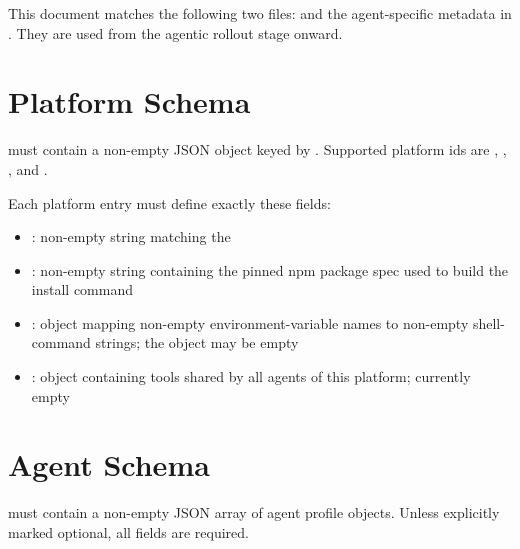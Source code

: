\documentclass[11pt]{article}
\begin{document}
\label{docstart:agent_profiles}
This document matches the following two files:  and the agent-specific metadata in .
They are used from the agentic rollout stage onward.

\section*{Platform Schema}
 must contain a non-empty JSON object keyed by .
Supported platform ids are , , , and .

Each platform entry must define exactly these fields:
\begin{itemize}
\item {}: non-empty string matching the 
\item {}: non-empty string containing the pinned npm package spec used to build the install command
\item {}: object mapping non-empty environment-variable names to non-empty shell-command strings; the object may be empty
\item {}: object containing tools shared by all agents of this platform; currently empty
\end{itemize}

\section*{Agent Schema}
 must contain a non-empty JSON array of agent profile objects.
Unless explicitly marked optional, all fields are required.
\end{document}
